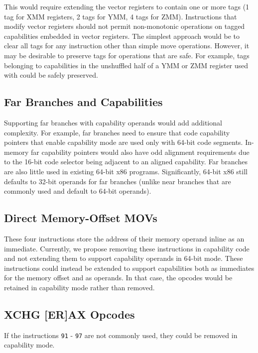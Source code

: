 This would require extending the vector registers to contain one or
more tags (1 tag for XMM registers, 2 tags for YMM, 4 tags for ZMM).
Instructions that modify vector registers should not permit
non-monotonic operations on tagged capabilities embedded in vector
registers.  The simplest approach would be to clear all tags for any
instruction other than simple move operations.  However, it may be
desirable to preserve tags for operations that are safe.  For
example, tags belonging to capabilities in the unshuffled half of a
YMM or ZMM register used with  could be safely
preserved.

\subsection{Far Branches and Capabilities}

Supporting far branches with capability operands would add additional
complexity.  For example, far branches need to ensure that code
capability pointers that enable capability mode are used only with
64-bit code segments.  In-memory far capability pointers would also
have odd alignment requirements due to the 16-bit code selector being
adjacent to an aligned capability.  Far branches are also little used
in existing 64-bit x86 programs.  Significantly, 64-bit x86 still
defaults to 32-bit operands for far branches (unlike near branches
that are commonly used and default to 64-bit operands).

\subsection{Direct Memory-Offset MOVs}

These four  instructions store the address of their
memory operand inline as an immediate.  Currently, we propose
removing these instructions in capability code and not extending
them to support capability operands in 64-bit mode.  These instructions could instead
be extended to support capabilities both as immediates for the memory
offset and as operands.  In that case, the opcodes would be retained
in capability mode rather than removed.

\subsection{XCHG [ER]AX Opcodes}

If the  instructions \texttt{91} - \texttt{97} are not
commonly used, they could be removed in capability mode.
